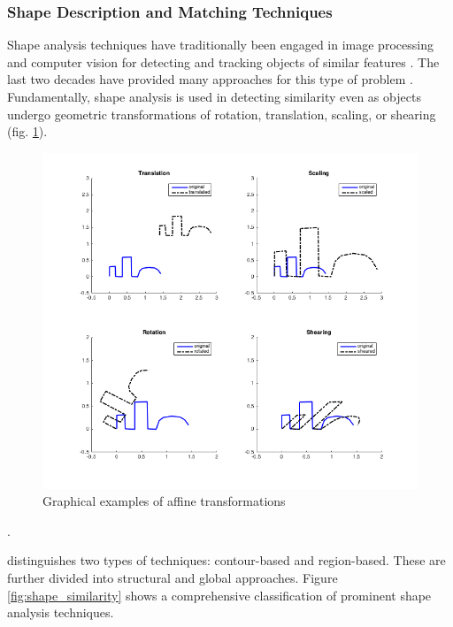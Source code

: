 \documentclass[11]{article}
\begin{document}
\subsubsection{Shape Description and Matching Techniques}
Shape analysis techniques have traditionally been engaged in image processing and computer vision for detecting and tracking objects of similar features \cite{loncaric1998,zhang2004,robert2012}.
The last two decades have provided many approaches for this type of problem \cite{loncaric1998,zhang2004,veltkamp2001,robert2012}.
Fundamentally, shape analysis is used in detecting similarity even as objects undergo geometric transformations of rotation, translation, scaling, or shearing (fig. \ref{fig:affine_transform}).

\begin{figure}[h]
  \centering
  \includegraphics[width=1\textwidth]{figures/affine_transform.png}
  \caption{Graphical examples of affine transformations}
  \label{fig:affine_transform}
\end{figure}  .     

\cite{zhang2004} distinguishes two types of techniques: contour-based and region-based.
These are further divided into structural and global approaches.
Figure \ref{fig:shape_similarity} shows a comprehensive classification of prominent shape analysis techniques. 
\end{document}
